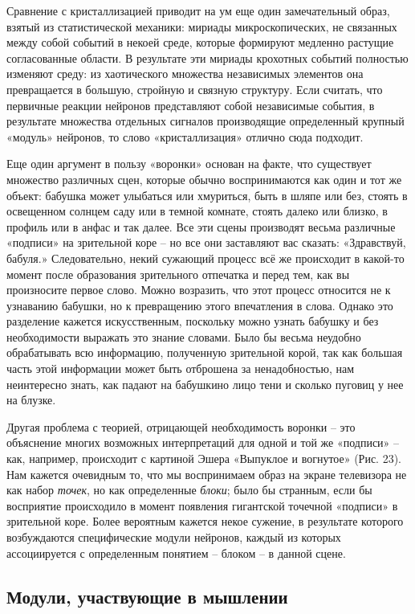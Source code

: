 \documentclass[../main.tex]{subfiles}
\begin{document}
Сравнение с кристаллизацией приводит на ум еще один замечательный образ, взятый из статистической механики: мириады микроскопических, не связанных между собой событий в некоей среде, которые формируют медленно растущие согласованные области. В результате эти мириады крохотных событий полностью изменяют среду: из хаотического множества независимых элементов она превращается в большую, стройную и связную структуру. Если считать, что первичные реакции нейронов представляют собой независимые события, в результате множества отдельных сигналов производящие определенный крупный «модуль» нейронов, то слово «кристаллизация» отлично сюда подходит.

Еще один аргумент в пользу «воронки» основан на факте, что существует множество различных сцен, которые обычно воспринимаются как один и тот же объект: бабушка может улыбаться или хмуриться, быть в шляпе или без, стоять в освещенном солнцем саду или в темной комнате, стоять далеко или близко, в профиль или в анфас и так далее. Все эти сцены производят весьма различные «подписи» на зрительной коре \--- но все они заставляют вас сказать: «Здравствуй, бабуля.» Следовательно, некий сужающий процесс всё же происходит в какой-то момент после образования зрительного отпечатка и перед тем, как вы произносите первое слово. Можно возразить, что этот процесс относится не к узнаванию бабушки, но к превращению этого впечатления в слова. Однако это разделение кажется искусственным, поскольку можно узнать бабушку и без необходимости выражать это знание словами. Было бы весьма неудобно обрабатывать всю информацию, полученную зрительной корой, так как большая часть этой информации может быть отброшена за ненадобностью, нам неинтересно знать, как падают на бабушкино лицо тени и сколько пуговиц у нее на блузке.

Другая проблема с теорией, отрицающей необходимость воронки \--- это объяснение многих возможных интерпретаций для одной и той же «подписи» \--- как, например, происходит с картиной Эшера «Выпуклое и вогнутое» (Рис. 23). Нам кажется очевидным то, что мы воспринимаем образ на экране телевизора не как набор \emph{точек}, но как определенные \emph{блоки}; было бы странным, если бы восприятие происходило в момент появления гигантской точечной «подписи» в зрительной коре. Более вероятным кажется некое сужение, в результате которого возбуждаются специфические модули нейронов, каждый из которых ассоциируется с определенным понятием \--- блоком \--- в данной сцене.


\subsection{Модули, участвующие в мышлении}
\end{document}
